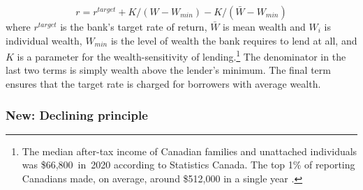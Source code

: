 {\begin{equation}
{r} = r^{target}+ K/(W-W_{min}) -K/(\bar W - W_{min})\label{eqn-interest-wealth-relationship}
\end{equation}
where  $r^{target}$ is the bank's target rate of return,  $\bar{W}$ is mean wealth and $W_i$ is individual wealth, $W_{min}$ is the level of wealth the bank requires to lend at all, and $K$ is a parameter for the wealth-sensitivity of lending.\footnote{The median after-tax income of Canadian families and unattached individuals was \$66,800 in 2020 according to Statistics Canada. %
 The top 1\% of reporting Canadians made, on average, around \$512,000 in a single year \cite{WEB_model-stats-can-canadian-incomes}. %
} The denominator in the last two terms is simply wealth above the lender's minimum. The final term ensures that the target rate is charged for borrowers with average wealth.





\subsubsection{New: Declining principle}\label{sec:declining-principle}

}
